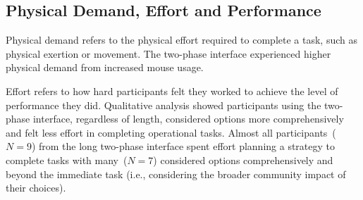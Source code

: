 





\subsection{Physical Demand, Effort and Performance}
Physical demand refers to the physical effort required to complete a task, such as physical exertion or movement. The two-phase interface experienced higher physical demand from increased mouse usage.

Effort refers to how hard participants felt they worked to achieve the level of performance they did. Qualitative analysis showed participants using the two-phase interface, regardless of length, considered options more comprehensively and felt less effort in completing operational tasks. Almost all participants~($N=9$) from the long two-phase interface spent effort planning a strategy to complete tasks with many~($N=7$) considered options comprehensively and beyond the immediate task (i.e., considering the broader community impact of their choices). 

